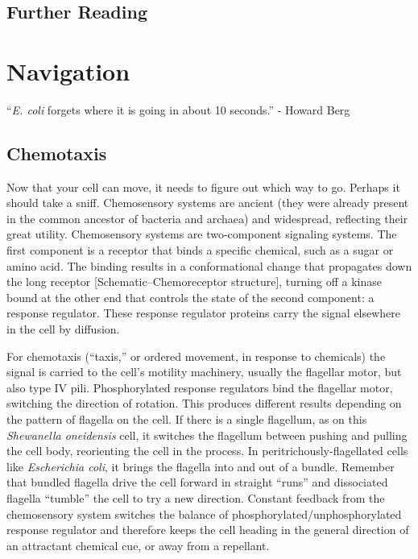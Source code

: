 \documentclass[]{tufte-book}
\begin{document}
\section{Further Reading}\label{further-reading-5}

\citet{albers2018} \citet{berg2003} \citet{jarrell2008}
\citet{munoz-dorado2016} \citet{shrivastava2015}

\chapter{Navigation}\label{navigation}

``\emph{E. coli} forgets where it is going in about 10 seconds.'' -
Howard Berg \citet{berg1988}

\section{Chemotaxis}\label{chemotaxis}

Now that your cell can move, it needs to figure out which way to go.
Perhaps it should take a sniff. Chemosensory systems are ancient (they
were already present in the common ancestor of bacteria and archaea) and
widespread, reflecting their great utility. Chemosensory systems are
two-component signaling systems. The first component is a receptor that
binds a specific chemical, such as a sugar or amino acid. The binding
results in a conformational change that propagates down the long
receptor {[}Schematic--Chemoreceptor structure{]}, turning off a kinase
bound at the other end that controls the state of the second component:
a response regulator. These response regulator proteins carry the signal
elsewhere in the cell by diffusion.

For chemotaxis (``taxis,'' or ordered movement, in response to
chemicals) the signal is carried to the cell's motility machinery,
usually the flagellar motor, but also type IV pili. Phosphorylated
response regulators bind the flagellar motor, switching the direction of
rotation. This produces different results depending on the pattern of
flagella on the cell. If there is a single flagellum, as on this
\emph{Shewanella oneidensis} cell, it switches the flagellum between
pushing and pulling the cell body, reorienting the cell in the process.
In peritrichously-flagellated cells like \emph{Escherichia coli}, it
brings the flagella into and out of a bundle. Remember that bundled
flagella drive the cell forward in straight ``runs'' and dissociated
flagella ``tumble'' the cell to try a new direction. Constant feedback
from the chemosensory system switches the balance of
phosphorylated/unphosphorylated response regulator and therefore keeps
the cell heading in the general direction of an attractant chemical cue,
or away from a repellant.
\end{document}
